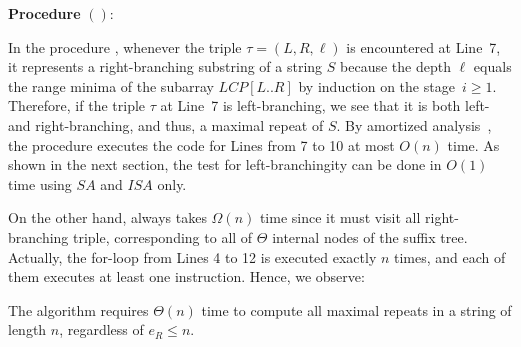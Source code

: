 {
  \setlength{\interspacetitleruled}{0pt}%
  \setlength{\algotitleheightrule}{0pt}%
  \begin{algorithm}[h]
  \textbf{Procedure} \BUSA$()$:\\
  \end{algorithm}
}  

In the procedure \BUSA{}, whenever the triple $\tau = (L, R, \ell)$ is encountered at Line~7, it represents a right-branching substring of a string $S$ because
the depth $\ell$ equals the range minima of the subarray $LCP[L..R]$ by induction on the stage~$i\ge 1$. Therefore, if the triple $\tau$ at Line~7 is left-branching, we see that it is both left- and right-branching, and thus, a maximal repeat of $S$. By amortized analysis~\cite{kasai:lee2001lcp:linear}, the procedure executes the code for Lines from 7 to 10 at most $O(n)$ time.
As shown in the next section, the test for left-branchingity can be done in $O(1)$ time using $SA$ and $ISA$ only.

On the other hand, \BUSA{} always takes $\Omega(n)$ time since it must visit all right-branching triple, corresponding to all of $\Theta$ internal nodes of the suffix tree. Actually, the for-loop from Lines 4 to 12 is executed exactly $n$ times, and each of them executes at least one instruction. Hence, we observe: 


\begin{remark}
\label{rem:lb:busa}  
  The algorithm \BUSA{} requires $\Theta(n)$ time to compute all maximal repeats in a string of length $n$, regardless of $e_R \le n$. 
\end{remark}


